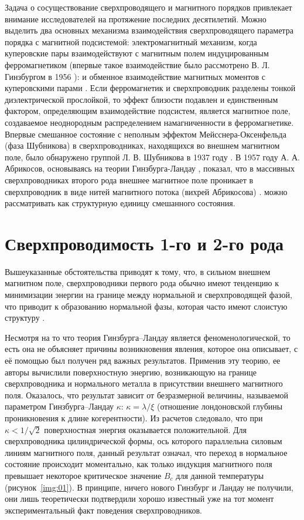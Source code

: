 Задача о сосуществование сверхпроводящего и магнитного порядков привлекает 
внимание исследователей на протяжение последних десятилетий. Можно выделить 
два основных механизма взаимодействия сверхпроводящего параметра порядка с 
магнитной подсистемой: электромагнитный механизм, когда куперовские пары 
взаимодействуют с магнитным полем индуцированным ферромагнетиком (впервые 
такое взаимодействие было рассмотрено В. Л. Гинзбургом в 1956 
\cite{ginzburg}): и обменное взаимодействие магнитных моментов с куперовскими 
парами \cite{buzdin,bulaev}. Если ферромагнетик и сверхпроводник разделены 
тонкой диэлектрической прослойкой, то эффект близости подавлен и единственным 
фактором, определяющим взаимодействие подсистем, является магнитное поле, 
создаваемое неоднородным распределением намагниченности в ферромагнетике.
Впервые смешанное состояние с неполным эффектом Мейсснера-Оксенфельда 
(фаза Шубникова) в сверхпроводниках, находящихся во внешнем магнитном поле, 
было обнаружено группой Л. В. Шубникова в 1937 году \cite{shubnikov}. В 1957 
году А. А. Абрикосов, основываясь на теории Гинзбурга-Ландау 
\cite{ginzburg-landau}, показал, что в массивных сверхпроводниках второго рода 
внешнее магнитное поле проникает в сверхпроводник в виде нитей магнитного 
потока (вихрей Абрикосова) \cite{abrikosov}. можно рассматривать как 
структурную единицу смешанного состояния.

\section{Сверхпроводимость 1-го и 2-го рода}

Вышеуказанные обстоятельства приводят к тому, что, в сильном внешнем магнитном 
поле, сверхпроводники первого рода обычно имеют тенденцию к минимизации 
энергии на границе между нормальной и сверхпроводящей фазой, что приводит к 
образованию нормальной фазы, которая часто имеют слоистую структуру 
\cite{bib:4}. 

Несмотря на то что теория Гинзбурга–Ландау является феноменологической, то 
есть она не объясняет причины возникновения явления, которое она описывает, с 
её помощью был получен ряд важных результатов. Применив эту теорию, ее авторы 
вычислили поверхностную энергию, возникающую на границе сверхпроводника и 
нормального металла в присутствии внешнего магнитного поля. Оказалось, что 
результат зависит от безразмерной величины, называемой параметром 
Гинзбурга–Ландау \( \kappa \): \( \kappa = \lambda/\xi \) (отношение 
лондоновской глубины проникновения к длине когерентности). Из расчетов 
следовало, что при \( \kappa < 1/\sqrt{2} \) поверхностная энергия оказывается 
положительной. Для сверхпроводника цилиндрической формы, ось которого 
параллельна силовым линиям магнитного поля, данный результат означал, что 
переход в нормальное состояние происходит моментально, как только индукция 
магнитного поля превышает некоторое критическое значение \( B_c \) для данной 
температуры (рисунок~\ref{img:01}). В принципе, ничего нового Гинзбург и 
Ландау не получили, они лишь теоретически подтвердили хорошо известный уже на 
тот момент экспериментальный факт поведения сверхпроводников.

